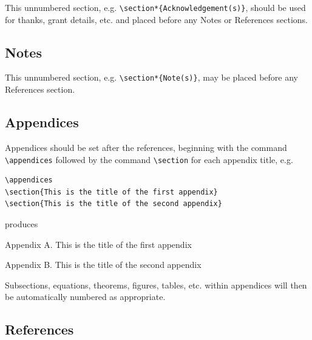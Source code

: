 \documentclass[]{cJEN2e}
\begin{document}
This unnumbered section, e.g. \verb"\section*{Acknowledgement(s)}", should be used for thanks, grant details, etc.
and placed before any Notes or References sections.

\subsection{Notes}

This unnumbered section, e.g. \verb"\section*{Note(s)}", may be placed before any References section.

\subsection{Appendices}

Appendices should be set after the references, beginning with the
command \verb"\appendices" followed by the command \verb"\section"
for each appendix title, e.g.
%
\begin{verbatim}
\appendices
\section{This is the title of the first appendix}
\section{This is the title of the second appendix}
\end{verbatim}

\noindent produces\medskip

\noindent Appendix A. This is the title of the first appendix

\noindent Appendix B. This is the title of the second appendix

\medskip
Subsections, equations, theorems, figures, tables, etc. within
appendices will then be automatically numbered as appropriate.


\subsection{References}\label{refs}
\end{document}
